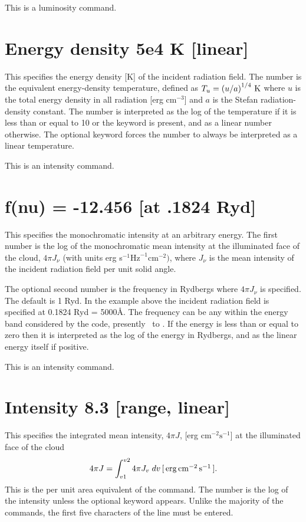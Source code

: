This is a luminosity command.

\section{Energy density 5e4 K [linear]}

This specifies the energy density [K] of the incident radiation field.
The number is the equivalent energy-density temperature, defined as
$T_u  = \left( {u/a} \right)^{1/4} {\rm\thinspace K}$
where $u$ is the total energy density in all radiation
[erg cm$^{-3}$] and $a$ is the Stefan radiation-density constant.
The number is interpreted as the log of the temperature if it is less than or equal to 10
or the keyword  is present,
and as a linear number otherwise.
The optional keyword  forces the
number to always be interpreted as a linear temperature.

This is an intensity command.

\section{f(nu) = -12.456 [at .1824 Ryd]}

This specifies the monochromatic intensity at an arbitrary energy.  The
first number is the log of the monochromatic mean intensity at the
illuminated face of the cloud,
$4\pi J_\nu$ (with units erg
s$^{-1}\mathrm{Hz}^{-1} \mathrm{cm}^{-2})$, where
$J_{\nu}$ is the mean intensity of the incident radiation field
per unit solid angle.

The optional second number is the frequency in Rydbergs where
$4\pi J_\nu$ is specified.
The default is 1 Ryd.
In the example above the incident radiation field is
specified at 0.1824 Ryd = 5000\AA.
The frequency can be any within the energy
band considered by the code,
presently \emm\ to \egamry .
If the energy is less than or equal to zero then it is interpreted as the
log of the energy in Rydbergs, and as the linear energy itself if positive.

This is an intensity command.

\section{Intensity 8.3 [range, linear]}
\label{sec:IntensityCommand}

This specifies the integrated mean intensity,
$4\pi J$, [erg cm$^{-2}\mathrm{s}^{-1}$] at the
illuminated face of the cloud
\begin{equation}
4\pi J= \int_{v1}^{v2}4\pi J_v \; dv \,[\mbox{${\rm\thinspace erg}{\rm\thinspace cm}^{-2}{\rm\thinspace s}^{-1}\,$}] .
\end{equation}
This is the per unit area equivalent of the 
command.
The number is the log of the intensity unless the optional
keyword  appears.
Unlike the majority of the commands, the first
five characters of the line must be entered.

